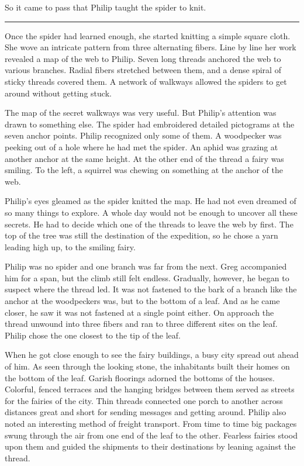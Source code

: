 \documentclass[10pt, draft]{memoir}
\renewcommand{\pfbreakdisplay}{\bigskip \ding{166} \bigskip}
\newcommand{\secbreak}{\fancybreak{\pfbreakdisplay}}
\begin{document}
So it came to pass that Philip taught the spider to knit.

\secbreak

Once the spider had learned enough, she started knitting a simple square cloth.
She wove an intricate pattern from three alternating fibers. Line by line her
work revealed a map of the web to Philip. Seven long threads anchored the web
to various branches. Radial fibers stretched between them, and a dense spiral
of sticky threads covered them. A network of walkways allowed the spiders to
get around without getting stuck.

The map of the secret walkways was very useful. But Philip's attention was
drawn to something else. The spider had embroidered detailed pictograms at the
seven anchor points. Philip recognized only some of them. A woodpecker was
peeking out of a hole where he had met the spider. An aphid was grazing at
another anchor at the same height. At the other end of the thread a fairy was
smiling. To the left, a squirrel was chewing on something at the anchor of the
web.

Philip's eyes gleamed as the spider knitted the map. He had not even dreamed of
so many things to explore. A whole day would not be enough to uncover all these
secrets. He had to decide which one of the threads to leave the web by first.
The top of the tree was still the destination of the expedition, so he chose a
yarn leading high up, to the smiling fairy.

Philip was no spider and one branch was far from the next. Greg accompanied him
for a span, but the climb still felt endless. Gradually, however, he began to
suspect where the thread led. It was not fastened to the bark of a branch like
the anchor at the woodpeckers was, but to the bottom of a leaf. And as he came
closer, he saw it was not fastened at a single point either. On approach the
thread unwound into three fibers and ran to three different sites on the leaf.
Philip chose the one closest to the tip of the leaf.

When he got close enough to see the fairy buildings, a busy city spread out
ahead of him. As seen through the looking stone, the inhabitants built their
homes on the bottom of the leaf. Garish floorings adorned the bottoms of the
houses. Colorful, fenced terraces and the hanging bridges between them served
as streets for the fairies of the city. Thin threads connected one porch to
another across distances great and short for sending messages and getting
around. Philip also noted an interesting method of freight transport. From time
to time big packages swung through the air from one end of the leaf to the
other. Fearless fairies stood upon them and guided the shipments to their
destinations by leaning against the thread.
\end{document}
